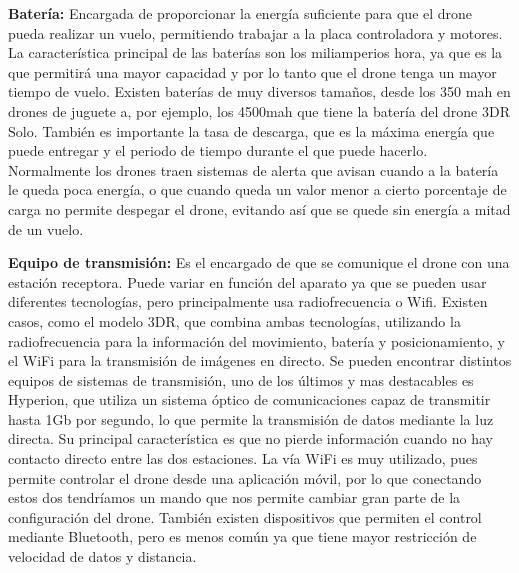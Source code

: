 \hspace{1 cm}\textbf{Bater\'ia:} Encargada de proporcionar la energ\'ia suficiente para que el drone pueda realizar un vuelo, permitiendo trabajar a la placa controladora y motores. La caracter\'istica principal de las bater\'ias son los miliamperios hora, ya que es la que permitir\'a una mayor capacidad y por lo tanto que el drone tenga un mayor tiempo de vuelo. Existen bater\'ias de muy diversos tamaños, desde los 350 mah en drones de juguete a, por ejemplo, los 4500mah que tiene la bater\'ia del drone 3DR Solo. Tambi\'en es importante la tasa de descarga, que es la m\'axima energ\'ia que puede entregar y el periodo de tiempo durante el que puede hacerlo. Normalmente los drones traen sistemas de alerta que avisan cuando a la bater\'ia le queda poca energ\'ia, o que cuando queda un valor menor a cierto porcentaje de carga no permite despegar el drone, evitando as\'i que se quede sin energ\'ia a mitad de un vuelo.


\hspace{1 cm}\textbf{Equipo de transmisi\'on:} Es el encargado de que se comunique el drone con una estaci\'on receptora. Puede variar en funci\'on del aparato ya que se pueden usar diferentes tecnolog\'ias, pero principalmente usa radiofrecuencia o Wifi. Existen casos, como el modelo 3DR, que combina ambas tecnolog\'ias, utilizando la radiofrecuencia para la informaci\'on del movimiento, bater\'ia y posicionamiento, y el WiFi para la transmisi\'on de im\'agenes en directo. Se pueden encontrar distintos equipos de sistemas de transmisi\'on, uno de los \'ultimos y mas destacables es Hyperion, que utiliza un sistema \'optico de comunicaciones capaz de transmitir hasta 1Gb por segundo, lo que permite la transmisi\'on de datos mediante la luz directa. Su principal caracter\'istica es que no pierde informaci\'on cuando no hay contacto directo entre las dos estaciones. La v\'ia WiFi es muy utilizado, pues permite controlar el drone desde una aplicaci\'on m\'ovil, por lo que conectando estos dos tendr\'iamos un mando que nos permite cambiar gran parte de la configuraci\'on del drone. Tambi\'en existen dispositivos que permiten el control mediante Bluetooth, pero es menos com\'un ya que tiene mayor restricci\'on de velocidad de datos y distancia. 


